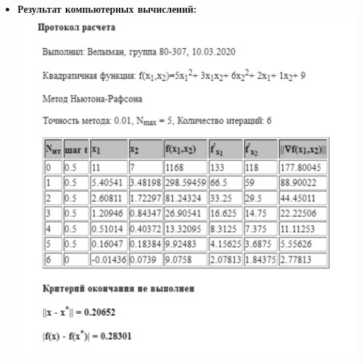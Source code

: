\begin{itemize}
    {\it Конец первой итерации.}
    
    \item {\bfseries Результат компьютерных вычислений:} \\
    \includegraphics[scale = 0.55]{img/5.PNG}
    
\end{itemize}

\pagebreak